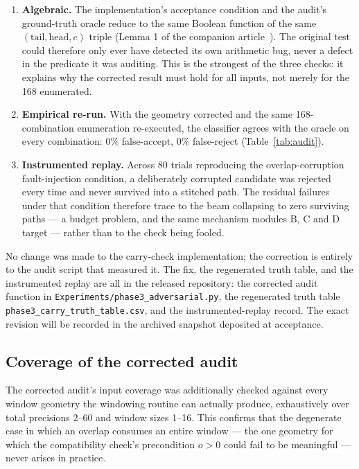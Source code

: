\documentclass[preprint,11pt]{elsarticle}
\begin{document}
\begin{enumerate}\itemsep3pt
\item \textbf{Algebraic.} The implementation's acceptance condition and
the audit's ground-truth oracle reduce to the same Boolean function of
the same $(\mathrm{tail},\mathrm{head},c)$ triple
(Lemma 1 of the companion article~\cite{methodpaper}). The original test could therefore only
ever have detected its own arithmetic bug, never a defect in the
predicate it was auditing. This is the strongest of the three checks: it
explains why the corrected result must hold for all inputs, not merely
for the 168 enumerated.
\item \textbf{Empirical re-run.} With the geometry corrected and the same
168-combination enumeration re-executed, the classifier agrees with the
oracle on every combination: 0\% false-accept, 0\% false-reject
(Table~\ref{tab:audit}).
\item \textbf{Instrumented replay.} Across 80 trials reproducing the
overlap-corruption fault-injection condition, a deliberately corrupted
candidate was rejected every time and never survived into a stitched
path. The residual failures under that condition therefore trace to the
beam collapsing to zero surviving paths --- a budget problem, and the
same mechanism modules B, C and D target --- rather than to the check
being fooled.
\end{enumerate}

No change was made to the carry-check implementation; the correction is
entirely to the audit script that measured it. The fix, the regenerated
truth table, and the instrumented replay are all in the released
repository: the corrected audit function in
\texttt{Experiments/phase3\_adversarial.py}, the regenerated truth table
\texttt{phase3\_carry\_truth\_table.csv}, and the instrumented-replay
record. The exact revision will be recorded in the archived snapshot
deposited at acceptance.

\subsection{Coverage of the corrected audit}

The corrected audit's input coverage was additionally checked against
every window geometry the windowing routine can actually produce,
exhaustively over total precisions 2--60 and window sizes 1--16. This
confirms that the degenerate case in which an overlap consumes an entire
window --- the one geometry for which the compatibility check's
precondition $o>0$ could fail to be meaningful --- never arises in
practice.
\end{document}
